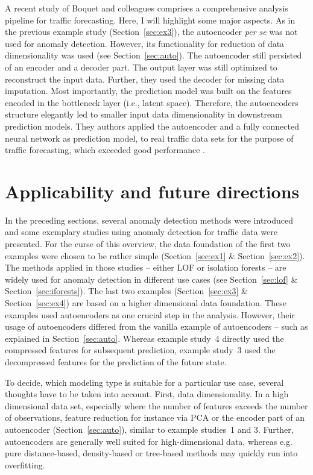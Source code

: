 \documentclass[conference]{IEEEtran}
\begin{document}
A recent study of Boquet and colleagues \cite{boquet2020variational} comprises a comprehensive analysis pipeline for traffic forecasting. Here, I will highlight some major aspects. As in the previous example study (Section~\ref{sec:ex3}), the autoencoder \textit{per se} was not used for anomaly detection. However, its functionality for reduction of data dimensionality was used (see Section~\ref{sec:auto}). The autoencoder still persisted of an encoder and a decoder part. The output layer was still optimized to reconstruct the input data. Further, they used the decoder for missing data imputation. Most importantly, the prediction model was built on the features encoded in the bottleneck layer (i.e., latent space). Therefore, the autoencoders structure elegantly led to smaller input data dimensionality in downstream prediction models. They authors applied the autoencoder and a fully connected neural network as prediction model, to real traffic data sets for the purpose of traffic forecasting, which exceeded good performance \cite{boquet2020variational}.


\section{Applicability and future directions}

In the preceding sections, several anomaly detection methods were introduced and some exemplary studies using anomaly detection for traffic data were presented. For the curse of this overview, the data foundation of the first two examples were chosen to be rather simple (Section~\ref{sec:ex1} \& Section~\ref{sec:ex2}). The methods applied in those studies -- either LOF or isolation forests -- are widely used for anomaly detection in different use cases (see Section~\ref{sec:lof} \& Section~\ref{sec:iforests}). The last two examples (Section~\ref{sec:ex3} \& Section~\ref{sec:ex4}) are based on a higher dimensional data foundation. These examples used autoencoders as one crucial step in the analysis. However, their usage of autoencoders differed from the vanilla example of autoencoders -- such as explained in Section~\ref{sec:auto}. Whereas example study~4 directly used the compressed features for subsequent prediction, example study~3 used the decompressed features for the prediction of the future state.

To decide, which modeling type is suitable for a particular use case, several thoughts have to be taken into account. First, data dimensionality. In a high dimensional data set, especially where the number of features exceeds the number of observations, feature reduction for instance via PCA or the encoder part of an autoencoder (Section~\ref{sec:auto}), similar to example studies~1 and 3. Further, autoencoders are generally well suited for high-dimensional data, whereas e.g. pure distance-based, density-based or tree-based methods may quickly run into overfitting.
\end{document}

